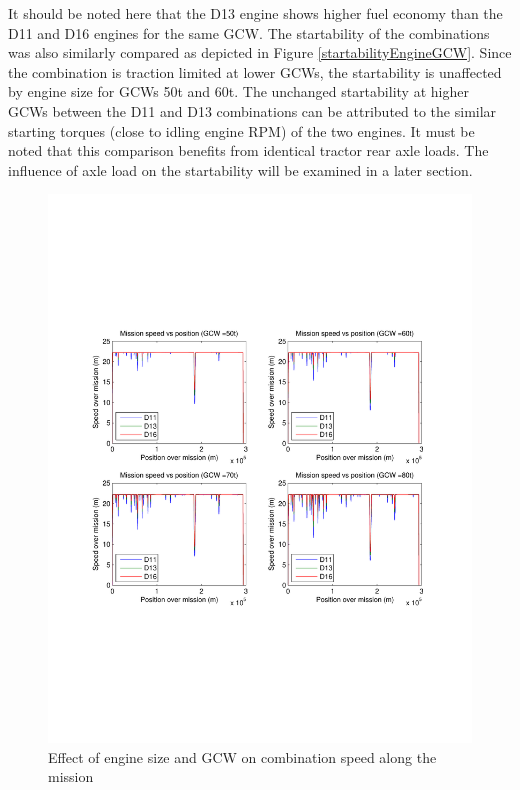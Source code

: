 \documentclass{article}
\begin{document}
It should be noted here that the D13 engine shows higher fuel economy than the D11 and D16 engines for the same GCW. The startability of the combinations was also similarly compared as depicted in Figure \ref{startabilityEngineGCW}. Since the combination is traction limited at lower GCWs, the startability is unaffected by engine size for GCWs 50t and 60t. The unchanged startability at higher GCWs between the D11 and D13 combinations can be attributed to the similar starting torques (close to idling engine RPM) of the two engines. It must be noted that this comparison benefits from identical tractor rear axle loads. The influence of axle load on the startability will be examined in a later section.\\

\begin{figure}[h!]
\centering
\includegraphics[width=\linewidth, clip=true, trim=45 185 65 208]{Figures/Engine_size_and_GCW/Mission_speed_vs_position.pdf}
\caption{Effect of engine size and GCW on combination speed along the mission}
\label{missionSpeedEngineSizeGCW}
\end{figure}
\end{document}
